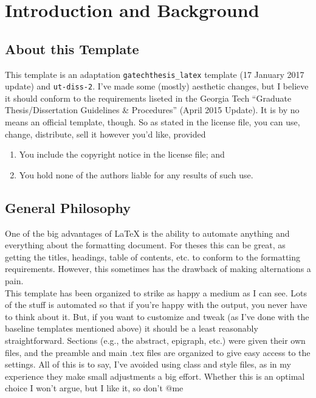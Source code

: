 \chapter{Introduction and Background}

\section{About this Template}
This template is an adaptation \texttt{gatechthesis\_latex} template (17 January 2017 update) and \texttt{ut-diss-2}. 
I've made some (mostly) aesthetic changes, but I believe it should conform to the requirements liseted in the Georgia Tech ``Graduate Thesis/Dissertation Guidelines \& Procedures'' (April 2015 Update).
It is by no means an official template, though. 
So as stated in the license file, you can use, change, distribute, sell it however you'd like, provided
\begin{enumerate}
  \item You include the copyright notice in the license file; and
  \item You hold none of the authors liable for any results of such use.\cite{ref2}
\end{enumerate}

\section{General Philosophy}
One of the big advantages of \LaTeX{} is the ability to automate anything and everything about the formatting document. 
For theses this can be great, as getting the titles, headings, table of contents, etc. to conform to the formatting requirements.
However, this sometimes has the drawback of making alternations a pain. \\

This template has been organized to strike as happy a medium as I can see. 
Lots of the stuff is automated so that if you're happy with the output, you never have to think about it. 
But, if you want to customize and tweak (as I've done with the baseline templates mentioned above) it should be a least reasonably straightforward.
Sections (e.g., the abstract, epigraph, etc.) were given their own files, and the preamble and main .tex files are organized to give easy access to the settings. 
All of this is to say, I've avoided using class and style files, as in my experience they make small adjustments a big effort.
Whether this is an optimal choice I won't argue, but I like it, so don't $@$me
